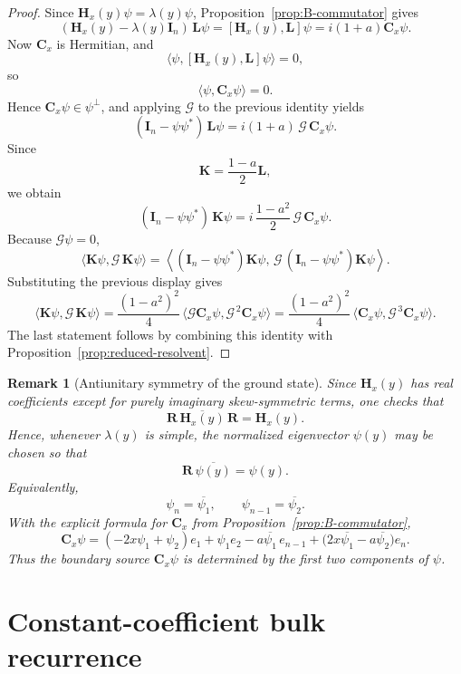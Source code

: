 \documentclass[11pt]{article}
\newtheorem{remark}[theorem]{Remark}
\begin{document}
\begin{proof}
Since \(\mathbf H_x(y)\psi=\lambda(y)\psi\), Proposition~\ref{prop:B-commutator} gives
\[
(\mathbf H_x(y)-\lambda(y)\mathbf I_n)\,\mathbf L\psi
=
[\mathbf H_x(y),\mathbf L]\psi
=
i(1+a)\mathbf C_x\psi.
\]
Now \(\mathbf C_x\) is Hermitian, and
\[
\langle \psi,[\mathbf H_x(y),\mathbf L]\psi\rangle=0,
\]
so
\[
\langle \psi,\mathbf C_x\psi\rangle=0.
\]
Hence \(\mathbf C_x\psi\in \psi^\perp\), and applying \(\mathcal G\) to the previous identity yields
\[
(\mathbf I_n-\psi\psi^*)\,\mathbf L\psi
=
i(1+a)\,\mathcal G\,\mathbf C_x\psi.
\]
Since
\[
\mathbf K=\frac{1-a}{2}\mathbf L,
\]
we obtain
\[
(\mathbf I_n-\psi\psi^*)\,\mathbf K\psi
=
i\,\frac{1-a^2}{2}\,\mathcal G\,\mathbf C_x\psi.
\]
Because \(\mathcal G\psi=0\),
\[
\langle \mathbf K\psi,\mathcal G\,\mathbf K\psi\rangle
=
\left\langle
(\mathbf I_n-\psi\psi^*)\mathbf K\psi,\,
\mathcal G\,(\mathbf I_n-\psi\psi^*)\mathbf K\psi
\right\rangle.
\]
Substituting the previous display gives
\[
\langle \mathbf K\psi,\mathcal G\,\mathbf K\psi\rangle
=
\frac{(1-a^2)^2}{4}\,
\langle \mathcal G\mathbf C_x\psi,\mathcal G^{\,2}\mathbf C_x\psi\rangle
=
\frac{(1-a^2)^2}{4}\,
\langle \mathbf C_x\psi,\mathcal G^{\,3}\mathbf C_x\psi\rangle.
\]
The last statement follows by combining this identity with Proposition~\ref{prop:reduced-resolvent}.
\end{proof}

\begin{remark}[Antiunitary symmetry of the ground state]\label{rem:antiunitary}
Since \(\mathbf H_x(y)\) has real coefficients except for purely imaginary skew-symmetric terms, one checks that
\[
\mathbf R\,\overline{\mathbf H_x(y)}\,\mathbf R=\mathbf H_x(y).
\]
Hence, whenever \(\lambda(y)\) is simple, the normalized eigenvector \(\psi(y)\) may be chosen so that
\[
\mathbf R\,\overline{\psi(y)}=\psi(y).
\]
Equivalently,
\[
\psi_n=\overline{\psi_1},
\qquad
\psi_{n-1}=\overline{\psi_2}.
\]
With the explicit formula for \(\mathbf C_x\) from Proposition~\ref{prop:B-commutator},
\[
\mathbf C_x\psi
=
(-2x\psi_1+\psi_2)e_1
+\psi_1e_2
-a\overline{\psi_1}\,e_{n-1}
+\bigl(2x\overline{\psi_1}-a\overline{\psi_2}\bigr)e_n.
\]
Thus the boundary source \(\mathbf C_x\psi\) is determined by the first two components of \(\psi\).
\end{remark}

\section{Constant-coefficient bulk recurrence}
\end{document}
